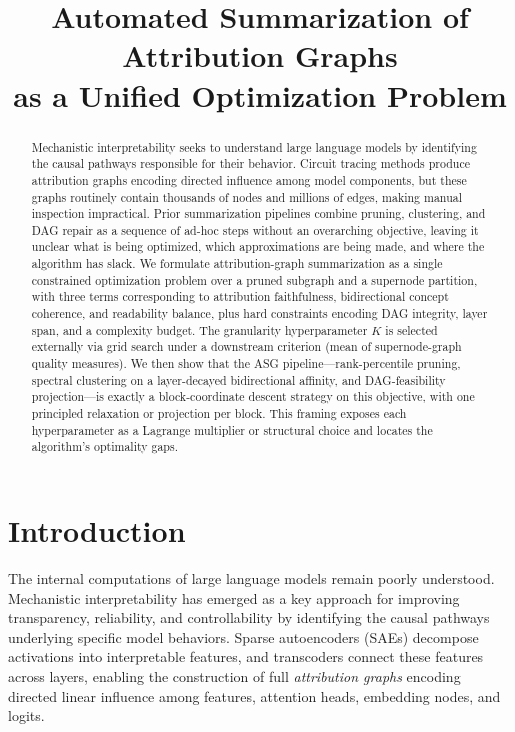 \documentclass[table, 11pt]{article}
\title{Automated Summarization of Attribution Graphs \\
as a Unified Optimization Problem}
\author{}
\begin{document}
\maketitle

\begin{abstract}
Mechanistic interpretability seeks to understand large language models
by identifying the causal pathways responsible for their behavior.
Circuit tracing methods produce attribution graphs encoding directed
influence among model components, but these graphs routinely contain
thousands of nodes and millions of edges, making manual inspection
impractical. Prior summarization pipelines combine pruning,
clustering, and DAG repair as a sequence of ad-hoc steps without an
overarching objective, leaving it unclear what is being optimized,
which approximations are being made, and where the algorithm has
slack. We formulate attribution-graph summarization as a single
constrained optimization problem over a pruned subgraph and a
supernode partition, with three terms corresponding to attribution
faithfulness, bidirectional concept coherence, and readability
balance, plus hard constraints encoding DAG integrity, layer span,
and a complexity budget. The granularity hyperparameter $K$ is
selected externally via grid search under a downstream criterion
(mean of supernode-graph quality measures). We then show that the
ASG pipeline---rank-percentile pruning, spectral clustering on a
layer-decayed bidirectional affinity, and DAG-feasibility
projection---is exactly a block-coordinate descent strategy on this
objective, with one principled relaxation or projection per block.
This framing exposes each hyperparameter as a Lagrange multiplier or
structural choice and locates the algorithm's optimality gaps.
\end{abstract}

\section{Introduction}\label{sec:intro}

The internal computations of large language models remain poorly
understood. Mechanistic interpretability has emerged as a key
approach for improving transparency, reliability, and controllability
by identifying the causal pathways underlying specific model
behaviors. Sparse autoencoders (SAEs) decompose activations into
interpretable features, and transcoders connect these features across
layers, enabling the construction of full \emph{attribution graphs}
encoding directed linear influence among features, attention heads,
embedding nodes, and logits.
\end{document}
